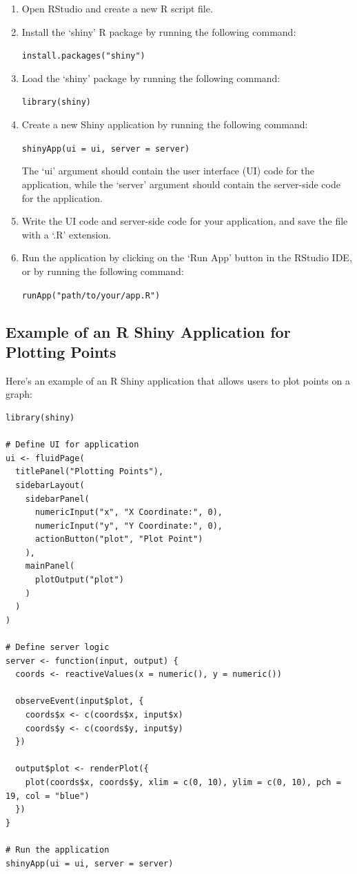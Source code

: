 \documentclass[
]{book}
\begin{document}
\begin{enumerate}
\def\labelenumi{\arabic{enumi}.}
\item
  Open RStudio and create a new R script file.
\item
  Install the `shiny' R package by running the following command:

  \texttt{install.packages("shiny")}
\item
  Load the `shiny' package by running the following command:

  \texttt{library(shiny)}
\item
  Create a new Shiny application by running the following command:

  \texttt{shinyApp(ui\ =\ ui,\ server\ =\ server)}

  The `ui' argument should contain the user interface (UI) code for the application, while the `server' argument should contain the server-side code for the application.
\item
  Write the UI code and server-side code for your application, and save the file with a `.R' extension.
\item
  Run the application by clicking on the `Run App' button in the RStudio IDE, or by running the following command:

  \texttt{runApp("path/to/your/app.R")}
\end{enumerate}

\hypertarget{example-of-an-r-shiny-application-for-plotting-points}{%
\subsection{Example of an R Shiny Application for Plotting Points}\label{example-of-an-r-shiny-application-for-plotting-points}}

Here's an example of an R Shiny application that allows users to plot points on a graph:

\begin{verbatim}
library(shiny)

# Define UI for application
ui <- fluidPage(
  titlePanel("Plotting Points"),
  sidebarLayout(
    sidebarPanel(
      numericInput("x", "X Coordinate:", 0),
      numericInput("y", "Y Coordinate:", 0),
      actionButton("plot", "Plot Point")
    ),
    mainPanel(
      plotOutput("plot")
    )
  )
)

# Define server logic
server <- function(input, output) {
  coords <- reactiveValues(x = numeric(), y = numeric())

  observeEvent(input$plot, {
    coords$x <- c(coords$x, input$x)
    coords$y <- c(coords$y, input$y)
  })

  output$plot <- renderPlot({
    plot(coords$x, coords$y, xlim = c(0, 10), ylim = c(0, 10), pch = 19, col = "blue")
  })
}

# Run the application
shinyApp(ui = ui, server = server)
\end{verbatim}
\end{document}

